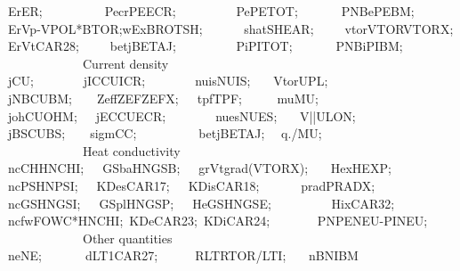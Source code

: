 {Er\bs ER;~~~~~~~~~~Pecr\bs PEECR;
			~~~~~~~~~Pe\bs PETOT;~~~~~~~PNBe\bs PEBM;
\\ \hspace*{1mm}
ErVp\bs-VPOL*BTOR;wExB\bs ROTSH;
		~~~~~~shat\bs SHEAR;~~~~~vtor\bs VTOR\bs\bs VTORX;
\\ \hspace*{1mm}
ErVt\bs CAR28;~~~~~betj\bs BETAJ;
			~~~~~~~~~Pi\bs PITOT;~~~~~~~PNBi\bs PIBM;
\\ \hspace*{1mm}
~~~~~~~~~~~~Current density
\\ \hspace*{1mm}
j\bs CU;~~~~~~~~jIC\bs CUICR;~~~~~~~~nuis\bs NUIS;
						~~~Vtor\bs UPL;
\\ \hspace*{1mm}
jNB\bs CUBM;~~~~Zeff\bs ZEF\bs\bs ZEFX;~~~tpf\bs TPF;
						~~~~~mu\bs MU;
\\ \hspace*{1mm}
joh\bs CUOHM;~~~jEC\bs CUECR;~~~~~~~~nues\bs NUES;
						~~~V||\bs ULON;
\\ \hspace*{1mm}
jBS\bs CUBS;~~~~sigm\bs CC;~~~~~~~~~~betj\bs BETAJ;
						~~q./MU;
\\ \hspace*{1mm}
~~~~~~~~~~~~Heat conductivity
\\ \hspace*{1mm}
ncCH\bs HNCHI;~~~GSba\bs HNGSB;~~~grVt\bs grad(VTORX);
						~~~Hex\bs HEXP;
\\ \hspace*{1mm}
ncPS\bs HNPSI;~~~KDes\bs CAR17;~~~KDis\bs CAR18;
						~~~~~~prad\bs PRADX;
\\ \hspace*{1mm}
ncGS\bs HNGSI;~~~GSpl\bs HNGSP;~~~HeGS\bs HNGSE;
					~~~~~~~~~Hix\bs CAR32;
\\ \hspace*{1mm}
ncfw\bs FOWC*HNCHI;~KDe\bs CAR23;~KDi\bs CAR24;
						~~~~~~~PN\bs PENEU-PINEU;
\\ \hspace*{1mm}
~~~~~~~~~~~~Other quantities
\\ \hspace*{1mm}
ne\bs NE;~~~~~~~dLT1\bs CAR27;~~~~~~RLT\bs RTOR/LTI;
						~~~nB\bs NIBM
\\ \hspace*{1mm}
}
